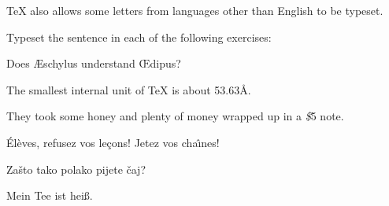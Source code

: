  
\TeX{} also allows some letters from languages other than English to 
be typeset. 
 
 
 
Typeset the sentence in each of the following exercises: 
 
\exercise Does \AE schylus understand \OE dipus? 
 
\exercise The smallest internal unit of \TeX{} is about 53.63\AA. 
 
\exercise They took some honey and plenty of money wrapped up in a 
{\it \$}5 note. 
 
\exercise \'El\`eves, refusez vos le\c cons! Jetez vos cha\^\i nes! 
 
\exercise Za\v sto tako polako pijete \v caj? 
 
\exercise Mein Tee ist hei\ss. 
 
